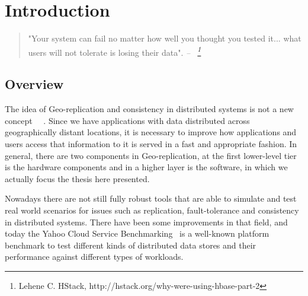 
%
%
%


\chapter{Introduction}
\label{ch:intro}

\begin{quotation}
"Your system can fail no matter how well you thought you tested it... what users will not tolerate is losing their data".
{\small\it -- ~\footnote{Lehene C. HStack, http://hstack.org/why-were-using-hbase-part-2} }
\end{quotation}




\section{Overview}
The idea of Geo-replication and consistency in distributed systems is not a new concept~\cite{Ferreira:98} ~\cite{Kubiatowicz:2000}. Since we have applications with data distributed across geographically distant locations, it is necessary to improve how applications and users access that information to it is served in a fast and appropriate fashion. In general, there are two components in Geo-replication, at the first lower-level  tier is the hardware components and in a higher layer is the software, in which we actually focus the thesis here presented.

Nowadays there are not still fully robust tools that are able to simulate and test real world scenarios for issues such as replication, fault-tolerance and consistency in distributed systems. There have been some improvements in that field, and today the Yahoo Cloud Service Benchmarking~\cite{YCSB:2010} is a well-known platform benchmark to test different kinds of distributed data stores and their performance against different types of workloads.

